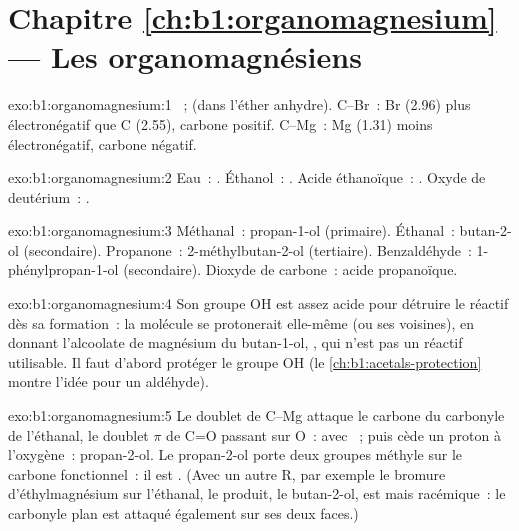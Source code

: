 \section*{Chapitre \ref{ch:b1:organomagnesium} --- Les organomagnésiens}

\begin{solution}{exo:b1:organomagnesium:1}
~;  (dans
l'éther anhydre). C--Br~: Br (2.96) plus électronégatif que C (2.55),
carbone positif. C--Mg~: Mg (1.31) moins électronégatif, carbone négatif.
\end{solution}

\begin{solution}{exo:b1:organomagnesium:2}
Eau~: .
Éthanol~: .
Acide éthanoïque~: .
Oxyde de deutérium~: .
\end{solution}

\begin{solution}{exo:b1:organomagnesium:3}
Méthanal~: propan-1-ol (primaire). Éthanal~: butan-2-ol (secondaire).
Propanone~: 2-méthylbutan-2-ol (tertiaire). Benzaldéhyde~:
1-phénylpropan-1-ol (secondaire). Dioxyde de carbone~: acide
propanoïque.
\end{solution}

\begin{solution}{exo:b1:organomagnesium:4}
Son groupe OH est assez acide pour détruire le réactif dès sa
formation~: la molécule se protonerait elle-même (ou ses voisines), en
donnant l'alcoolate de magnésium du butan-1-ol, , qui
n'est pas un réactif utilisable. Il faut d'abord protéger le groupe OH
(le \cref{ch:b1:acetals-protection} montre l'idée pour un aldéhyde).
\end{solution}

\begin{solution}{exo:b1:organomagnesium:5}
Le doublet de C--Mg attaque le carbone du carbonyle de l'éthanal, le
doublet $\pi$ de C=O passant sur O~:  avec
~; puis  cède un proton à l'oxygène~: propan-2-ol. Le
propan-2-ol porte deux groupes méthyle sur le carbone fonctionnel~: il
est . (Avec un autre R, par exemple le bromure d'éthylmagnésium
sur l'éthanal, le produit, le butan-2-ol, est  mais racémique~: le
carbonyle plan est attaqué également sur ses deux faces.)
\end{solution}

